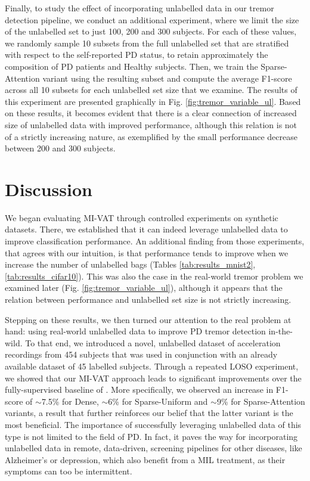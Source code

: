 \documentclass[journal,twoside,web]{ieeecolor}
\begin{document}
Finally, to study the effect of incorporating unlabelled data in our tremor
detection pipeline, we conduct an additional experiment, where we limit the size
of the unlabelled set to just 100, 200 and 300 subjects.  For each of these
values, we randomly sample 10 subsets from the full unlabelled set that are
stratified with respect to the self-reported PD status, to retain approximately
the composition of PD patients and Healthy subjects. Then, we train the
Sparse-Attention variant using the resulting subset and compute the average
F1-score across all 10 subsets for each unlabelled set size that we examine. The
results of this experiment are presented graphically in Fig.
\ref{fig:tremor_variable_ul}. Based on these results, it becomes evident that
there is a clear connection of increased size of unlabelled data with improved
performance, although this relation is not of a strictly increasing nature, as
exemplified by the small performance decrease between 200 and 300 subjects. 



\section{Discussion}
\label{sec:discussion}
We began evaluating MI-VAT through controlled experiments on synthetic datasets.
There, we established that it can  indeed leverage unlabelled data to improve
classification performance.  An additional finding from those experiments, that
agrees with our intuition, is that performance  tends to improve when we
increase the number of unlabelled bags (Tables \ref{tab:results_mnist2},
\ref{tab:results_cifar10}). This was also the case in the real-world tremor
problem we examined later (Fig. \ref{fig:tremor_variable_ul}),  although 
it appears that the relation between performance and unlabelled set size is not
strictly increasing.
 
Stepping on these results, we then turned our attention to the real problem at
hand: using real-world unlabelled data to improve PD tremor detection
in-the-wild. To that end, we introduced a novel, unlabelled dataset of
acceleration recordings from 454 subjects that was used in conjunction with an
already available dataset of 45 labelled subjects. Through a repeated LOSO
experiment,  we showed that our MI-VAT approach leads to significant
improvements over the fully-supervised baseline of \cite{alpapado2019tremor}.
More specifically, we observed an increase in F1-score of $\sim$7.5\% for Dense,
$\sim$6\% for Sparse-Uniform and $\sim$9\% for Sparse-Attention variants, a
result that further reinforces our belief that the latter variant is the most
beneficial. The importance of successfully leveraging unlabelled data of this
type is not limited to the field of PD. In fact, it paves the way for
incorporating unlabelled data in remote, data-driven, screening pipelines for
other diseases, like Alzheimer's or depression, which also benefit from a MIL
treatment, as their symptoms can too be intermittent.
\end{document}
